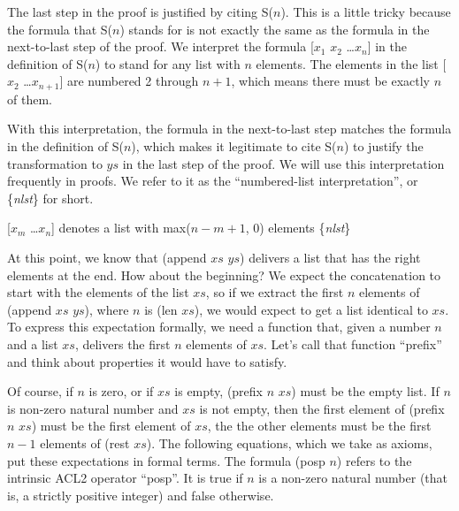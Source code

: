 The last step in the proof is justified by citing S($n$).
This is a little tricky because the formula that S($n$)
stands for is not exactly the same as the formula in the next-to-last step of the proof.
We interpret the formula [$x_1$ $x_2$ \dots $x_n$] in the definition of S($n$)
to stand for any list with $n$ elements.
The elements in the list [$x_2$ \dots $x_{n+1}$] are numbered 2 through $n+1$,
which means there must be exactly $n$ of them.

With this interpretation, the formula in the next-to-last step
matches the formula in the definition of S($n$),
which makes it legitimate to cite S($n$) to justify
the transformation to $ys$ in the last step of the proof.
We will use this interpretation frequently in proofs.
We refer to it as the ``numbered-list interpretation'', or \{\emph{nlst}\} for short.

\begin{samepage}
\label{numbered-list-interpretation}
\begin{center}

\begin{comment} %
Numbered List Interpretation  \{\emph{nlst}\}   \\
\end{comment} %
[$x_m$ \dots $x_n$]
denotes a list with max($n-m+1$, 0) elements \{\emph{nlst}\}
\end{center}
\end{samepage}


At this point, we know that (append $xs$ $ys$) delivers
a list that has the right elements at the end.
How about the beginning?
We expect the concatenation to start with the elements of the list $xs$,
so if we extract the first $n$ elements of (append $xs$ $ys$), where $n$ is (len $xs$),
we would expect to get a list identical to $xs$.
To express this expectation formally, we need a function that,
given a number $n$ and a list $xs$, delivers the first $n$ elements of $xs$.
Let's call that function ``prefix'' and think about properties it would have to satisfy.

Of course, if $n$ is zero, or if $xs$ is empty,
(prefix $n$ $xs$) must be the empty list.
If $n$ is non-zero natural number and $xs$ is not empty,
then the first element of (prefix $n$ $xs$) must be the first element of $xs$,
the the other elements must be the first $n-1$ elements of (rest $xs$).
The following equations, which we take as axioms,
put these expectations in formal terms.
\label{posp-def}
The formula (posp $n$) refers to the intrinsic ACL2 operator ``posp''.
It is true if $n$ is a non-zero natural number
(that is, a strictly positive integer) and false otherwise.

